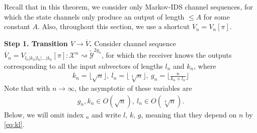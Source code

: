 \documentclass[journal, twocol]{IEEEtran}
\newcommand{\bff}{{\mathbf{f}}}
\newcommand{\bfI}{{\mathbf{I}}}
\newcommand{\bfS}{{\mathbf{S}}}
\newcommand{\oV}{{\overline{V}}}
\newcommand{\tV}{{\widetilde{V}}}
\newcommand{\mX}{{\mathcal{X}}}
\newcommand{\mY}{{\mathcal{Y}}}
\newcommand{\tmY}{{\widetilde{\mY}}}
\newcommand{\floor}[1]{\lfloor{{#1}\rfloor}}
\newcommand{\tosq}{\rightsquigarrow}
\newcommand{\bg}{\mathbf{g}}
\begin{document}
Recall that in this theorem, we consider only Markov-IDS channel sequences, for which the state channels only produce an output of length $\leq A$ for some constant $A$.
Also, throughout this section, we use a shortcut $V_n=V_n[\pi]$.


\textbf{Step 1. Transition $V\to\oV$.}
Consider channel sequence $\oV_{n}=V_{l_n|k_n|l_n|...|k_n}[\pi]:\mX^n\tosq\tmY^{2g_n}$, for which the receiver knows the outputs corresponding to all the input subvectors of lengths $l_n$ and $k_n$, where 
\begin{align}
k_n=\floor{\sqrt{n}},~l_n=\floor{\sqrt[4]{n}},~g_n=\bigg\lfloor\frac{n}{k_n+l_n}\bigg\rfloor
\label{eq:kl}
\end{align}
Note that with $n\to\infty$, the asymptotic of these variables are
\begin{align}
g_n, k_n \in O(\sqrt{n}),~l_n\in O(\sqrt[4]{n}).
\label{eq:allasy}
\end{align}
Below, we will omit index $_n$ and write $l$, $k$, $g$, meaning that they depend on $n$ by \eqref{eq:kl}.
\end{document}

